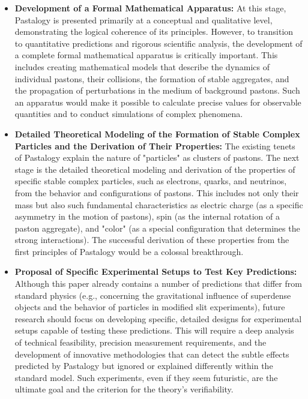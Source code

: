 \documentclass[pdflatex,sn-mathphys-num,referee]{sn-jnl}
\begin{document}
\begin{itemize}
    \item \textbf{Development of a Formal Mathematical Apparatus:} At this stage, Pastalogy is presented primarily at a conceptual and qualitative level, demonstrating the logical coherence of its principles. However, to transition to quantitative predictions and rigorous scientific analysis, the development of a complete formal mathematical apparatus is critically important. This includes creating mathematical models that describe the dynamics of individual pastons, their collisions, the formation of stable aggregates, and the propagation of perturbations in the medium of background pastons. Such an apparatus would make it possible to calculate precise values for observable quantities and to conduct simulations of complex phenomena.
    
    \item \textbf{Detailed Theoretical Modeling of the Formation of Stable Complex Particles and the Derivation of Their Properties:} The existing tenets of Pastalogy explain the nature of "particles" as clusters of pastons. The next stage is the detailed theoretical modeling and derivation of the properties of specific stable complex particles, such as electrons, quarks, and neutrinos, from the behavior and configurations of pastons. This includes not only their mass but also such fundamental characteristics as electric charge (as a specific asymmetry in the motion of pastons), spin (as the internal rotation of a paston aggregate), and "color" (as a special configuration that determines the strong interactions). The successful derivation of these properties from the first principles of Pastalogy would be a colossal breakthrough.
    
    \item \textbf{Proposal of Specific Experimental Setups to Test Key Predictions:} Although this paper already contains a number of predictions that differ from standard physics (e.g., concerning the gravitational influence of superdense objects and the behavior of particles in modified slit experiments), future research should focus on developing specific, detailed designs for experimental setups capable of testing these predictions. This will require a deep analysis of technical feasibility, precision measurement requirements, and the development of innovative methodologies that can detect the subtle effects predicted by Pastalogy but ignored or explained differently within the standard model. Such experiments, even if they seem futuristic, are the ultimate goal and the criterion for the theory's verifiability.
\end{itemize}
\end{document}
